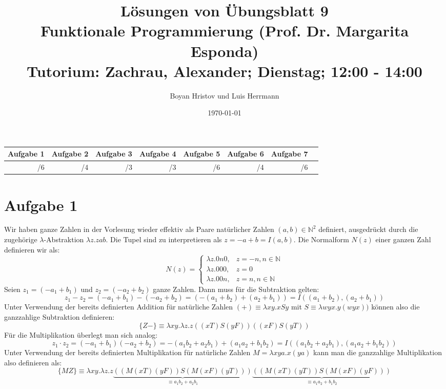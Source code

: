 \documentclass[11, 12pt]{article}
\begin{document}
\title
{
Lösungen von Übungsblatt 9 \\
Funktionale Programmierung (Prof. Dr. Margarita Esponda) \\
\normalsize Tutorium: Zachrau, Alexander; Dienstag; 12:00 - 14:00
}
\author{Boyan Hristov und Luis Herrmann}
\date{\today}
\maketitle

\begin{tabular}{|r|r|r|r|r|r|r|r}
\hline 
Aufgabe 1 & Aufgabe 2 & Aufgabe 3 & Aufgabe 4 & Aufgabe 5 & Aufgabe 6 & Aufgabe 7 \\ 
\hline 
/6 & /4 & /3 & /3 & /6 & /4 & /6\\ 
\hline 
\end{tabular}
%
\section*{Aufgabe 1}
Wir haben ganze Zahlen in der Vorlesung wieder effektiv als Paare natürlicher Zahlen $(a,b)\in\mathbb{N}^2$ definiert, ausgedrückt durch die zugehörige $\lambda$-Abstraktion $\lambda z.zab$. Die Tupel sind zu interpretieren als $z=-a+b=I(a,b)$. Die Normalform $N(z)$ einer ganzen Zahl definieren wir als:
\begin{equation*}
	N(z)=\begin{cases}
	\lambda z.0n0,& z=-n,n\in\mathbb{N}\\
	\lambda z.000,& z=0\\
	\lambda z.00n,& z=n,n\in\mathbb{N}
	\end{cases}
\end{equation*}
Seien $z_1=(-a_1+b_1)$ und $z_2=(-a_2+b_2)$ ganze Zahlen. Dann muss für die Subtraktion gelten:
\begin{equation*}
	z_1-z_2=(-a_1+b_1)-(-a_2+b_2)=(-(a_1+b_2)+(a_2+b_1))=I((a_1+b_2),(a_2+b_1))
\end{equation*}
Unter Verwendung der bereits definierten Addition für natürliche Zahlen $(+)\equiv \lambda xy. xSy$ mit $S\equiv λwyx.y(wyx))$ können also die ganzzahlige Subtraktion definieren:
\begin{equation*}
	\{Z-\}\equiv \lambda xy.\lambda z.z((xT)S(yF))((xF)S(yT))
\end{equation*}
Für die Multiplikation überlegt man sich analog:
\begin{equation*}
	z_1\cdot z_2 = (-a_1+b_1)(-a_2+b_2)=-(a_1b_2+a_2b_1)+(a_1a_2+b_1b_2)=I((a_1b_2+a_2b_1),(a_1a_2+b_1b_2))
\end{equation*}
Unter Verwendung der bereits definierten Multiplikation für natürliche Zahlen $M=\lambda xya.x(ya)$ kann man die ganzzahlige Multiplikation also definieren als:
\begin{equation*}
	\{MZ\}\equiv \lambda xy.\lambda z.z\underbrace{((M(xT)(yF))S(M(xF)(yT)))}_{\equiv a_1b_2+a_2b_1}\underbrace{((M(xT)(yT))S(M(xF)(yF)))}_{\equiv a_1a_2+b_1b_2}
\end{equation*}
\end{document}
